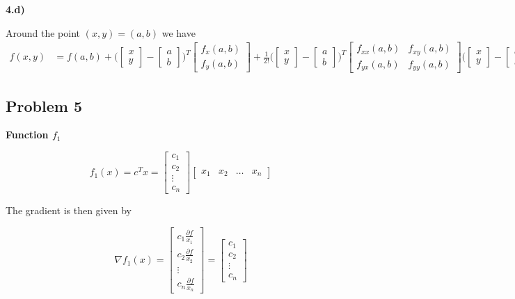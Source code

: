 \textbf{4.d)}

Around the point $(x, y) = (a, b)$ we have
\begin{align*}
f(x, y) &= f(a, b) + 
\Bigg( 
	\begin{bmatrix}
    	x \\
    	y
	\end{bmatrix}
	-
	\begin{bmatrix}
    	a \\
    	b
	\end{bmatrix}
\Bigg)^T
	\begin{bmatrix}
    	f_x(a,b) \\
    	f_y(a,b)
	\end{bmatrix}
+
\frac{1}{2!}
\Bigg( 
	\begin{bmatrix}
    	x \\
    	y
	\end{bmatrix}
	-
	\begin{bmatrix}
    	a \\
    	b
	\end{bmatrix}
\Bigg)^T
	\begin{bmatrix}
    	f_{xx}(a,b) & f_{xy}(a,b)\\
    	f_{yx}(a,b) & f_{yy}(a,b)
	\end{bmatrix}
\Bigg( 
	\begin{bmatrix}
    	x \\
    	y
	\end{bmatrix}
	-
	\begin{bmatrix}
    	a \\
    	b
	\end{bmatrix}
\Bigg)
\end{align*}

\subsection{Problem 5}

\textbf{Function $f_1$}

\[
f_1(x) = c^T x =
\begin{bmatrix}
	c_1 \\ c_2 \\ \vdots \\ c_n
\end{bmatrix}
\begin{bmatrix}
	x_1 & x_2 & \ldots & x_n
\end{bmatrix}
\]

The gradient is then given by

\[
\nabla f_1(x) = 
\begin{bmatrix}
	c_1 \frac{\partial f}{x_1} \\ 
	c_2 \frac{\partial f}{x_2} \\ 
	\vdots \\ 
	c_n \frac{\partial f}{x_n}
\end{bmatrix}
=
\begin{bmatrix}
	c_1 \\ 
	c_2\\ 
	\vdots \\ 
	c_n 
\end{bmatrix}
\]

